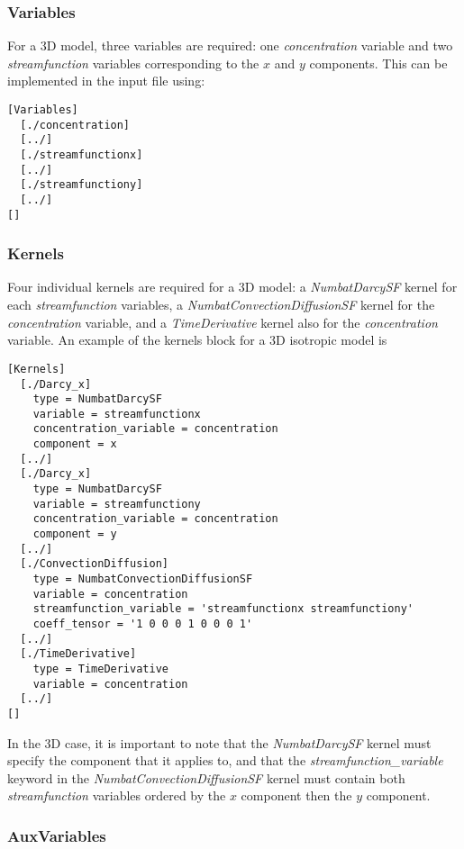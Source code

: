 \documentclass[11pt, a4paper]{csiroreport2012}
\begin{document}
\subsubsection*{Variables}

For a 3D model, three variables are required: one \emph{concentration} variable and two \emph{streamfunction} variables corresponding to the $x$ and $y$ components. This can be implemented in the input file using:
\begin{shaded}
\begin{verbatim}
[Variables]
  [./concentration]
  [../]
  [./streamfunctionx]
  [../]
  [./streamfunctiony]
  [../]
[]
\end{verbatim}
\end{shaded}

\subsubsection*{Kernels}

Four individual kernels are required for a 3D model: a \emph{NumbatDarcySF} kernel for each \emph{streamfunction} variables, a \emph{NumbatConvectionDiffusionSF} kernel for the \emph{concentration} variable, and a \emph{TimeDerivative} kernel also for the \emph{concentration} variable. An example of the kernels block for a 3D isotropic model is
\begin{shaded}
\begin{verbatim}
[Kernels]
  [./Darcy_x]
    type = NumbatDarcySF
    variable = streamfunctionx
    concentration_variable = concentration
    component = x
  [../]
  [./Darcy_x]
    type = NumbatDarcySF
    variable = streamfunctiony
    concentration_variable = concentration
    component = y
  [../]
  [./ConvectionDiffusion]
    type = NumbatConvectionDiffusionSF
    variable = concentration
    streamfunction_variable = 'streamfunctionx streamfunctiony'
    coeff_tensor = '1 0 0 0 1 0 0 0 1'
  [../]
  [./TimeDerivative]
    type = TimeDerivative
    variable = concentration
  [../]
[]
\end{verbatim}
\end{shaded}

In the 3D case, it is important to note that the \emph{NumbatDarcySF} kernel must specify the component that it applies to, and that the \emph{streamfunction\_variable} keyword in the \emph{NumbatConvectionDiffusionSF} kernel must contain both \emph{streamfunction} variables ordered by the $x$ component then the $y$ component.

\subsubsection*{AuxVariables}
\end{document}
